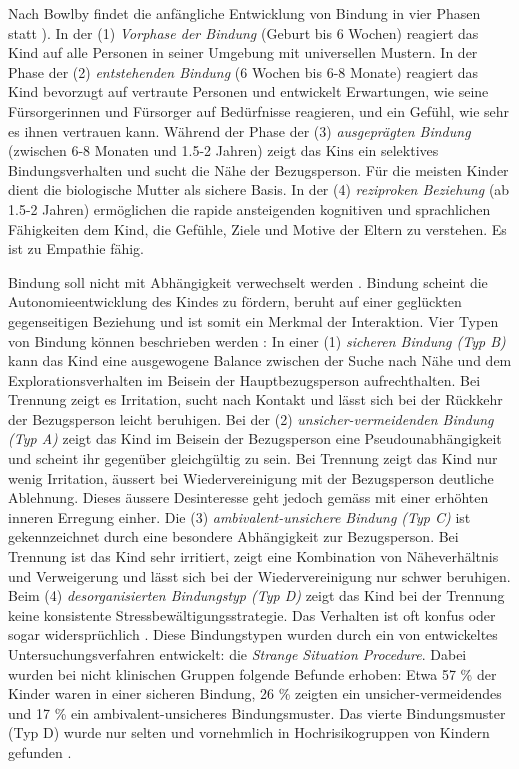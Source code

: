 Nach Bowlby findet die anfängliche Entwicklung von Bindung in vier Phasen statt \cite{Siegler2008}). In der (1) \textit{Vorphase der Bindung} (Geburt bis 6 Wochen) reagiert das Kind auf alle Personen in seiner Umgebung mit universellen Mustern. In der Phase der (2) \textit{entstehenden Bindung} (6 Wochen bis 6-8 Monate) reagiert das Kind bevorzugt auf vertraute Personen und entwickelt Erwartungen, wie seine Fürsorgerinnen und Fürsorger auf Bedürfnisse reagieren, und ein Gefühl, wie sehr es ihnen vertrauen kann. Während der Phase der (3) \textit{ausgeprägten Bindung} (zwischen 6-8 Monaten und 1.5-2 Jahren) zeigt das Kins ein selektives Bindungsverhalten und sucht die Nähe der Bezugsperson. Für die meisten Kinder dient die biologische Mutter als sichere Basis. In der (4) \textit{reziproken Beziehung} (ab 1.5-2 Jahren) ermöglichen die rapide ansteigenden kognitiven und sprachlichen Fähigkeiten dem Kind, die Gefühle, Ziele und Motive der Eltern zu verstehen. Es ist zu Empathie fähig.

Bindung soll nicht mit Abhängigkeit verwechselt werden \cite{Schmidt1996}. Bindung scheint die Autonomieentwicklung des Kindes zu fördern, beruht auf einer geglückten gegenseitigen Beziehung und ist somit ein Merkmal der Interaktion. Vier Typen von Bindung können beschrieben werden \cite{Resch1999}: In einer (1) \textit{sicheren Bindung (Typ B)} kann das Kind eine ausgewogene Balance zwischen der Suche nach Nähe und dem Explorationsverhalten im Beisein der Hauptbezugsperson aufrechthalten. Bei Trennung zeigt es Irritation, sucht nach Kontakt und lässt sich bei der Rückkehr der Bezugsperson leicht beruhigen. Bei der (2) \textit{unsicher-vermeidenden Bindung (Typ A)} zeigt das Kind im Beisein der Bezugsperson eine Pseudounabhängigkeit und scheint ihr gegenüber gleichgültig zu sein. Bei Trennung zeigt das Kind nur wenig Irritation, äussert bei Wiedervereinigung mit der Bezugsperson deutliche Ablehnung. Dieses äussere Desinteresse geht jedoch gemäss  mit einer erhöhten inneren Erregung einher. Die (3) \textit{ambivalent-unsichere Bindung (Typ C)} ist gekennzeichnet durch eine besondere Abhängigkeit zur Bezugsperson. Bei Trennung ist das Kind sehr irritiert, zeigt eine Kombination von Näheverhältnis und Verweigerung und lässt sich bei der Wiedervereinigung nur schwer beruhigen. Beim (4) \textit{desorganisierten Bindungstyp (Typ D)} zeigt das Kind bei der Trennung keine konsistente Stressbewältigungsstrategie. Das Verhalten ist oft konfus oder sogar widersprüchlich \cite{Siegler2008}. Diese Bindungstypen wurden durch ein von  entwickeltes Untersuchungsverfahren entwickelt: die \textit{Strange Situation Procedure}. Dabei wurden bei nicht klinischen Gruppen folgende Befunde erhoben: Etwa 57 \% der Kinder waren in einer sicheren Bindung, 26 \% zeigten ein unsicher-vermeidendes und 17 \% ein ambivalent-unsicheres Bindungsmuster. Das vierte Bindungsmuster (Typ D) wurde nur selten und vornehmlich in Hochrisikogruppen von Kindern gefunden \cite{Resch1999}.

